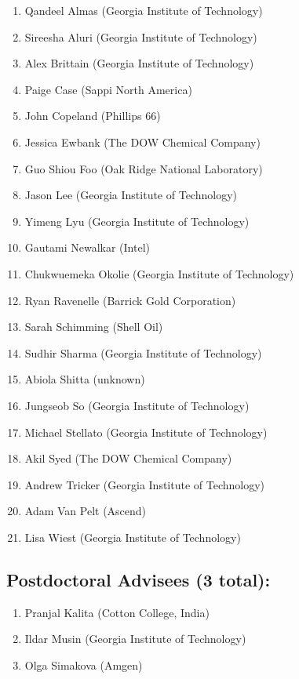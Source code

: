 \begin{enumerate}
\item
  Qandeel Almas (Georgia Institute of Technology)
\item
  Sireesha Aluri (Georgia Institute of Technology)
\item
  Alex Brittain (Georgia Institute of Technology)
\item
  Paige Case (Sappi North America)
\item
  John Copeland (Phillips 66)
\item
  Jessica Ewbank (The DOW Chemical Company)
\item
  Guo Shiou Foo (Oak Ridge National Laboratory)
\item
  Jason Lee (Georgia Institute of Technology)
\item
  Yimeng Lyu (Georgia Institute of Technology)
\item
  Gautami Newalkar (Intel)
\item
  Chukwuemeka Okolie (Georgia Institute of Technology)
\item
  Ryan Ravenelle (Barrick Gold Corporation)
\item
  Sarah Schimming (Shell Oil)
\item
  Sudhir Sharma (Georgia Institute of Technology)
\item
  Abiola Shitta (unknown)
\item
  Jungseob So (Georgia Institute of Technology)
\item
  Michael Stellato (Georgia Institute of Technology)
\item
  Akil Syed (The DOW Chemical Company)
\item
  Andrew Tricker (Georgia Institute of Technology)
\item
  Adam Van Pelt (Ascend)
\item
  Lisa Wiest (Georgia Institute of Technology)
\end{enumerate}

\subsection{Postdoctoral Advisees (3 total):}

\begin{enumerate}
\item
  Pranjal Kalita (Cotton College, India)
\item
  Ildar Musin (Georgia Institute of Technology)
\item
  Olga Simakova (Amgen)
\end{enumerate}